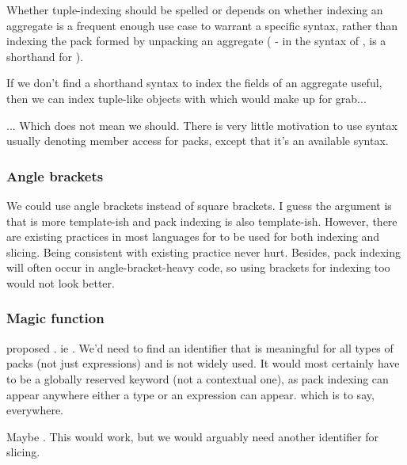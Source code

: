 \documentclass{wg21}
\begin{document}
Whether tuple-indexing should be spelled  or \tcode{[]} depends on whether indexing an aggregate is a frequent enough use case
to warrant a specific syntax, rather than indexing the pack formed by unpacking an aggregate ( - in the syntax of ,  is a shorthand for ).

If we don't find a shorthand syntax to index the fields of an aggregate useful, then we can index tuple-like objects with  which would make
 up for grab...

... Which does not mean we should. There is very little motivation to use syntax usually denoting member access for packs, except that it's an available syntax.

\subsubsection{Angle brackets}

We could use angle brackets instead of square brackets. I guess the argument is that \tcode{<>} is more template-ish and pack indexing is also template-ish.
However, there are existing practices in most languages for \tcode{[]} to be used for both indexing and slicing.
Being consistent with existing practice never hurt.
Besides, pack indexing will often occur in angle-bracket-heavy code, so using brackets for indexing too would not look better.

\subsubsection{Magic function}

 proposed . ie .
We'd need to find an identifier that is meaningful for all types of packs (not just expressions) and is not widely used.
It would most certainly have to be a globally reserved keyword (not a contextual one), as pack indexing can appear anywhere either a type or an expression can appear. which is to say, everywhere.

Maybe . This would work, but we would arguably need another identifier for slicing.

\subsubsection{}
\end{document}
